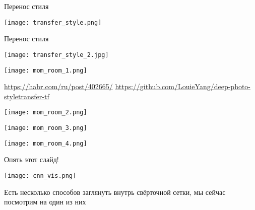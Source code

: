 \documentclass[notes,12pt, aspectratio=169]{beamer}
\begin{document}
\begin{frame}{Перенос стиля}
\begin{center}
\texttt{[image: transfer\_style.png]}
\end{center}
\end{frame}


\begin{frame}{Перенос стиля}
\begin{center}
\texttt{[image: transfer\_style\_2.jpg]}
\end{center}
\end{frame}


\begin{frame}
\begin{center}
\texttt{[image: mom\_room\_1.png]}
\end{center}

\vfill
\footnotesize
{\color{blue} \url{https://habr.com/ru/post/402665/}} \newline 
{\color{blue} \url{https://github.com/LouieYang/deep-photo-styletransfer-tf}} 
\end{frame}


\begin{frame}
\begin{center}
\texttt{[image: mom\_room\_2.png]}
\end{center}
\end{frame}


\begin{frame}
\begin{center}
\texttt{[image: mom\_room\_3.png]}
\end{center}
\end{frame}


\begin{frame}
\begin{center}
\texttt{[image: mom\_room\_4.png]}
\end{center}
\end{frame}


\begin{frame}{Опять этот слайд!}
\begin{center}
\texttt{[image: cnn\_vis.png]}
\end{center}

Есть несколько способов заглянуть внутрь свёрточной сетки, мы сейчас посмотрим на один из них
\end{frame}
\end{document}
